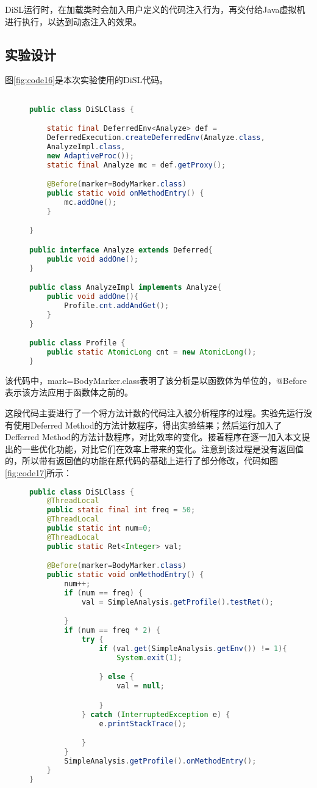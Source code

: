 DiSL运行时，在加载类时会加入用户定义的代码注入行为，再交付给Java虚拟机进行执行，以达到动态注入的效果。

\subsection{实验设计}

图\ref{fig:code16}是本次实验使用的DiSL代码。

\begin{figure}[!htp]
\begin{lstlisting}[language=Java]

public class DiSLClass {

	static final DeferredEnv<Analyze> def = 
	DeferredExecution.createDeferredEnv(Analyze.class, 
	AnalyzeImpl.class, 
	new AdaptiveProc());
	static final Analyze mc = def.getProxy();

	@Before(marker=BodyMarker.class)
	public static void onMethodEntry() {
		mc.addOne();
	}

}

public interface Analyze extends Deferred{
	public void addOne();
}

public class AnalyzeImpl implements Analyze{
	public void addOne(){
		Profile.cnt.addAndGet();
	}
}

public class Profile {
	public static AtomicLong cnt = new AtomicLong();
}
\end{lstlisting}
\end{figure}

该代码中，mark=BodyMarker.class表明了该分析是以函数体为单位的，@Before表示该方法应用于函数体之前的。

这段代码主要进行了一个将方法计数的代码注入被分析程序的过程。实验先运行没有使用Deferred Method的方法计数程序，得出实验结果；然后运行加入了Defferred Method的方法计数程序，对比效率的变化。接着程序在逐一加入本文提出的一些优化功能，对比它们在效率上带来的变化。注意到该过程是没有返回值的，所以带有返回值的功能在原代码的基础上进行了部分修改，代码如图\ref{fig:code17}所示：

\begin{figure}[!htp]
\begin{lstlisting}[language=Java]
public class DiSLClass {
	@ThreadLocal
	public static final int freq = 50;
	@ThreadLocal
	public static int num=0;
	@ThreadLocal
	public static Ret<Integer> val;

	@Before(marker=BodyMarker.class)
	public static void onMethodEntry() {
		num++;
		if (num == freq) {
			val = SimpleAnalysis.getProfile().testRet();

		}
		if (num == freq * 2) {
			try {
				if (val.get(SimpleAnalysis.getEnv()) != 1){
					System.exit(1);

				} else {
					val = null;

				}
			} catch (InterruptedException e) {
				e.printStackTrace();

			}
		}
		SimpleAnalysis.getProfile().onMethodEntry();
	}
}
\end{lstlisting}
\end{figure}

